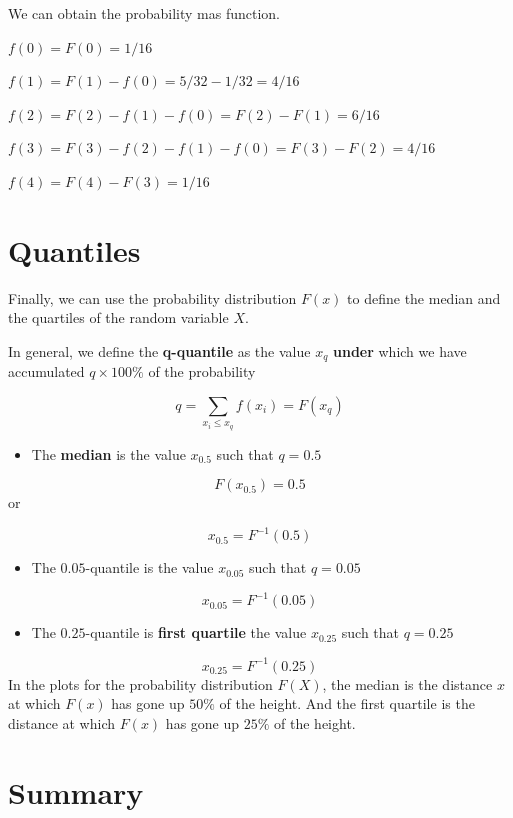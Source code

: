 \documentclass[
]{book}
\providecommand{\tightlist}{%
  \setlength{\itemsep}{0pt}\setlength{\parskip}{0pt}}
\begin{document}
We can obtain the probability mas function.

\(f(0)=F(0)=1/16\)

\(f(1)=F(1)-f(0)=5/32-1/32=4/16\)

\(f(2)=F(2)-f(1)-f(0)=F(2)-F(1)=6/16\)

\(f(3)=F(3)-f(2)-f(1)-f(0)=F(3)-F(2)=4/16\)

\(f(4)=F(4)-F(3)=1/16\)

\hypertarget{quantiles}{%
\section{Quantiles}\label{quantiles}}

Finally, we can use the probability distribution \(F(x)\) to define the median and the quartiles of the random variable \(X\).

In general, we define the \textbf{q-quantile} as the value \(x_{q}\) \textbf{under} which we have accumulated \(q\times 100\%\) of the probability

\[q=\sum_{x_i\leq x_q} f(x_i) = F (x_q)\]

\begin{itemize}
\tightlist
\item
  The \textbf{median} is the value \(x_{0.5}\) such that \(q=0.5\)
\end{itemize}

\[F(x_{0.5})=0.5\]
or

\[x_{0.5}=F^{-1}(0.5)\]

\begin{itemize}
\tightlist
\item
  The \(0.05\)-quantile is the value \(x_{0.05}\) such that \(q=0.05\)
\end{itemize}

\[x_{0.05}=F^{-1}(0.05)\]

\begin{itemize}
\tightlist
\item
  The \(0.25\)-quantile is \textbf{first quartile} the value \(x_{0.25}\) such that \(q=0.25\)
\end{itemize}

\[x_{0.25}=F^{-1}(0.25)\]
In the plots for the probability distribution \(F(X)\), the median is the distance \(x\) at which \(F(x)\) has gone up \(50\%\) of the height. And the first quartile is the distance at which \(F(x)\) has gone up \(25\%\) of the height.

\hypertarget{summary}{%
\section{Summary}\label{summary}}
\end{document}
